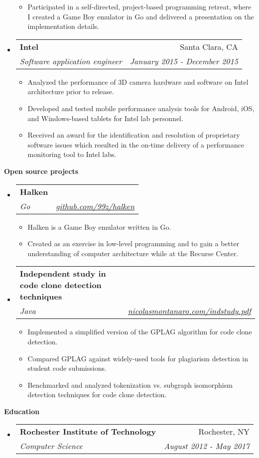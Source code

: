 \documentclass[letterpaper,11pt]{article}
\makeatletter
\newcommand{\resitem}[1]{\item #1 \vspace{-2pt}}
\newcommand{\resheading}[1]{{\large \colorbox{mygrey}{\begin{minipage}{\textwidth}{\textbf{#1 \vphantom{p\^{E}}}}\end{minipage}}}}
\newcommand{\ressubheading}[4]{
\begin{tabular*}{7.0in}{l@{\extracolsep{\fill}}r}
		\textbf{#1} & #2 \\
		\textit{#3} & \textit{#4} \\
\end{tabular*}\vspace{-6pt}}
\makeatother
\begin{document}
\begin{itemize}
	\begin{itemize}
		\resitem{Participated in a self-directed, project-based programming retreat, where I created a Game Boy emulator in Go and delivered a presentation on the implementation details.}
	\end{itemize}
\item 
	\ressubheading{Intel}{Santa Clara, CA}{Software application engineer}{January 2015 - December 2015}
	\begin{itemize}
		\resitem{Analyzed the performance of 3D camera hardware and software on Intel architecture prior to release.}
		\resitem{Developed and tested mobile performance analysis tools for Android, iOS, and Windows-based tablets for Intel lab
		personnel.}
		\resitem{Received an award for the identification and resolution of proprietary software issues which resulted in the on-time delivery of a performance
		monitoring tool to Intel labs.}
	\end{itemize}
\end{itemize}

\resheading{Open source projects}

\begin{itemize}
\item 
	\ressubheading{Halken}{}{Go}{\href{https://github.com/99z/halken}{github.com/99z/halken}}
	\begin{itemize}
		\resitem{Halken is a Game Boy emulator written in Go.}
		\resitem{Created as an exercise in low-level programming and to gain a better understanding of computer architecture while at the Recurse Center.}
	\end{itemize}
\item 
	\ressubheading{Independent study in code clone detection techniques}{}{Java}{\href{https://nicolasmontanaro.com/indstudy.pdf}{nicolasmontanaro.com/indstudy.pdf}}
	\begin{itemize}
		\resitem{Implemented a simplified version of the GPLAG algorithm for code clone detection.}
		\resitem{Compared GPLAG against widely-used tools for plagiarism detection in student code submissions.}
		\resitem{Benchmarked and analyzed tokenization vs. subgraph isomorphism detection techniques for code clone detection.}
	\end{itemize}
\end{itemize}

\resheading{Education}
\begin{itemize}
	\item \ressubheading{Rochester Institute of Technology}{Rochester, NY}{Computer Science}{August 2012 - May 2017}
\end{itemize}
\end{document}
